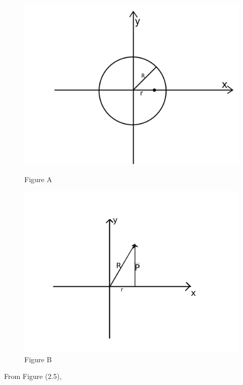 \begin{figure}[!tbp] 
\centering
\begin{minipage}[b]{0.4\textwidth}
\includegraphics[width=\textwidth]{fig2}
\caption{Figure A}
\end{minipage}
\hfill
\begin{minipage}[b]{0.4\textwidth}
\includegraphics[width=\textwidth]{fig1}
\caption{Figure B}
\end{minipage}
\end{figure}

From Figure (2.5), 

